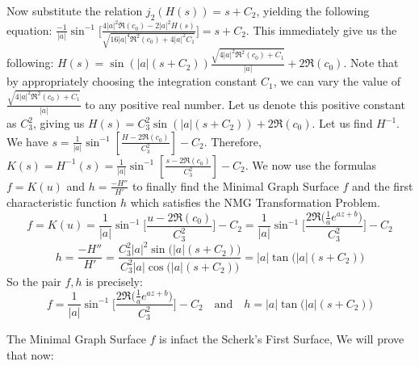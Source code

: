 \documentclass[12pt]{article}
\theoremstyle{plain}
\theoremstyle{definition}
\theoremstyle{remark}
\begin{document}
Now substitute the relation \(j_2(H(s)) = s + C_2\), yielding the following equation: \(\frac{-1}{|a|} \sin^{-1}\big[ \frac{4|a|^2 \Re(c_0)-2|a|^2H(s)}{\sqrt{16|a|^4 \Re^2(c_0)+4|a|^2 C_1}}\big]=s+C_2\). This immediately give us the following: \(H(s) = \sin\left(|a|(s + C_2)\right) \tfrac{\sqrt{4|a|^2 \Re^2(c_0) + C_1}}{|a|} + 2\Re(c_0)\). Note that by appropriately choosing the integration constant \(C_1\), we can vary the value of \(\tfrac{\sqrt{4|a|^2 \Re^2(c_0) + C_1}}{|a|}\) to any positive real number. Let us denote this positive constant as \(C_3^2\), giving us \(H(s) = C_3^2 \sin\left(|a|(s + C_2)\right) + 2\Re(c_0)\). Let us find \(H^{-1}\). We have \(s = \frac{1}{|a|} \sin^{-1}\left[\frac{H - 2\Re(c_0)}{C_3^2}\right] - C_2\). Therefore, \(K(s) = H^{-1}(s) = \frac{1}{|a|} \sin^{-1}\left[\frac{s - 2\Re(c_0)}{C_3^2}\right] - C_2\). We now use the formulas \(f=K(u)\) and \(h=\frac{-H''}{H'}\) to finally find the Minimal Graph Surface \(f\) and the first characteristic function \(h\) which satisfies the NMG Transformation Problem.
\[
  f=K(u)=\frac{1}{|a|} \sin^{-1}\Big[\frac{u - 2\Re(c_0)}{C_3^2}\Big]-C_2=\frac{1}{|a|} \sin^{-1}\Big[\frac{2\Re\big(\frac{1}{a} e^{a z + b}\big)}{C_3^2}\Big]-C_2
\]
\[
  h=\frac{-H''}{H'}=\frac{C_3^2|a|^2\sin\big(|a|(s + C_2)\big)}{C_3^2|a|\cos\big(|a|(s + C_2)\big)}=|a|\tan\big(|a|(s + C_2)\big)
\]
So the pair \(f,h\) is precisely:
\begin{equation}
	\label{eqn: soln k=0}
	\boxed{f=\frac{1}{|a|} \sin^{-1}\Big[\frac{2\Re\big(\frac{1}{a} e^{a z + b}\big)}{C_3^2}\Big]-C_2}\quad\text{and}\quad\boxed{h=|a|\tan\big(|a|(s + C_2)\big)}
\end{equation}

The Minimal Graph Surface \(f\) is infact the Scherk’s First Surface, We will prove that now:\\
\end{document}
